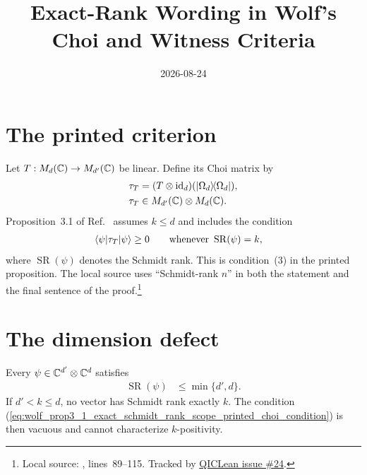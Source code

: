 \documentclass{article}
\title{Exact-Rank Wording in Wolf's Choi and Witness Criteria}
\author{}
\date{2026-08-24}
\begin{document}
\maketitle
{}

\section{The printed criterion}

Let $T:M_d(\mathbb{C})\to M_{d'}(\mathbb{C})$ be linear. Define its Choi matrix by
\begin{align}
    \tau_T
        &=(T\otimes\operatorname{id}_d)
          (|\Omega_d\rangle\!\langle \Omega_d|),
    \label{eq:wolf_prop3_1_exact_schmidt_rank_scope_choi_definition}\\
    \tau_T
        &\in M_{d'}(\mathbb{C})\otimes M_d(\mathbb{C}).
    \label{eq:wolf_prop3_1_exact_schmidt_rank_scope_choi_space}
\end{align}
Proposition~3.1 of Ref.~\cite{Wolf2012Quantum} assumes $k\leq d$ and includes
the condition
\begin{align}
    \langle \psi|\tau_T|\psi\rangle
        &\geq0
        \qquad\text{whenever }\operatorname{SR}(\psi)=k,
    \label{eq:wolf_prop3_1_exact_schmidt_rank_scope_printed_choi_condition}
\end{align}
where $\operatorname{SR}(\psi)$ denotes the Schmidt rank. This is condition~(3)
in the printed proposition. The local source uses ``Schmidt-rank $n$'' in
both the statement and the final sentence of the proof.\footnote{Local source:
,
lines~89--115. Tracked by
\href{https://github.com/LionSR/QICLean/issues/24}{QICLean issue \#24}.}

\section{The dimension defect}

Every $\psi\in\mathbb{C}^{d'}\otimes\mathbb{C}^d$ satisfies
\begin{align}
    \operatorname{SR}(\psi)
        &\leq\min\{d',d\}.
    \label{eq:wolf_prop3_1_exact_schmidt_rank_scope_rank_dimension_bound}
\end{align}
If $d'<k\leq d$, no vector has Schmidt rank exactly $k$. The condition
(\ref{eq:wolf_prop3_1_exact_schmidt_rank_scope_printed_choi_condition}) is
then vacuous and cannot characterize $k$-positivity.
\end{document}
